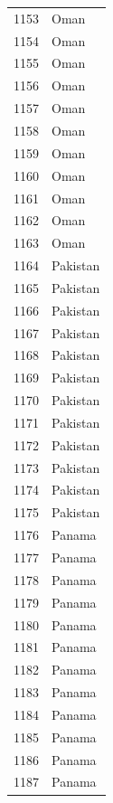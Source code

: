 \documentclass[
  letterpaper,
  DIV=11,
  numbers=noendperiod]{scrreprt}
\begin{document}
\begin{tabular}{ll}
1153 &                      Oman \\
1154 &                      Oman \\
1155 &                      Oman \\
1156 &                      Oman \\
1157 &                      Oman \\
1158 &                      Oman \\
1159 &                      Oman \\
1160 &                      Oman \\
1161 &                      Oman \\
1162 &                      Oman \\
1163 &                      Oman \\
1164 &                  Pakistan \\
1165 &                  Pakistan \\
1166 &                  Pakistan \\
1167 &                  Pakistan \\
1168 &                  Pakistan \\
1169 &                  Pakistan \\
1170 &                  Pakistan \\
1171 &                  Pakistan \\
1172 &                  Pakistan \\
1173 &                  Pakistan \\
1174 &                  Pakistan \\
1175 &                  Pakistan \\
1176 &                    Panama \\
1177 &                    Panama \\
1178 &                    Panama \\
1179 &                    Panama \\
1180 &                    Panama \\
1181 &                    Panama \\
1182 &                    Panama \\
1183 &                    Panama \\
1184 &                    Panama \\
1185 &                    Panama \\
1186 &                    Panama \\
1187 &                    Panama \\

\end{tabular}
\end{document}
